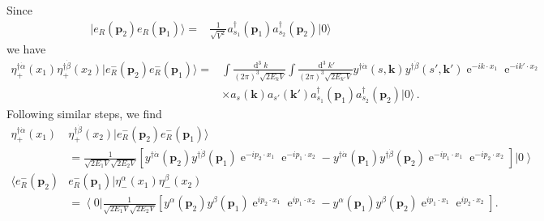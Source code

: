 Since
\begin{align}
  |e_R(\mathbf{p}_2)e_R(\mathbf{p}_1)\rangle=&\frac{1}{\sqrt{V^2}}a_{s_1}^\dagger(\mathbf{p}_1)a_{s_2}^\dagger(\mathbf{p}_2)|0\rangle
\end{align}
we have
\begin{align}
   \eta^{\dagger\dot{\alpha}}_+(x_1)\eta^{\dagger\dot{\beta}}_+(x_2)|e_R^-(\mathbf{p}_2)e_R^-(\mathbf{p}_1)\rangle=&
\int\frac{\operatorname{d}^3k}{(2\pi)^3\sqrt{2E_k V}}\int\frac{\operatorname{d}^3k'}{(2\pi)^3\sqrt{2E_{k'}V}}
y^{\dagger\dot{\alpha}}(s,\mathbf{k})y^{\dagger\dot{\beta}}(s',\mathbf{k}')\operatorname{e}^{-i k\cdot x_1}\operatorname{e}^{-i k'\cdot x_2}\nonumber\\
&\times a_s(\mathbf{k})a_{s'}(\mathbf{k}')a_{s_1}^\dagger(\mathbf{p}_1)a_{s_2}^\dagger(\mathbf{p}_2)|0\rangle \,.
\end{align}
Following similar steps, we find
\begin{align}
\eta^{\dagger\dot{\alpha}}_+(x_1)&\eta^{\dagger\dot{\beta}}_+(x_2)|e_R^-(\mathbf{p}_2)e_R^-(\mathbf{p}_1)\rangle
 \nonumber\\
\label{eq:berer}
&=\frac{1 }{\sqrt{2 E_1V}\sqrt{2 E_2V}} \left[ y^{\dagger\dot{\alpha}}(\mathbf{p}_2)y^{\dagger\dot{\beta}}(\mathbf{p}_1)
\operatorname{e}^{-i p_2\cdot x_1}\operatorname{e}^{-i p_1\cdot x_2}
-y^{\dagger\dot{\alpha}}(\mathbf{p}_1)y^{\dagger\dot{\beta}}(\mathbf{p}_2)
\operatorname{e}^{-i p_1\cdot x_1}\operatorname{e}^{-i p_2\cdot x_2}   \right] \left|0\right\rangle \\
\langle e_R^-(\mathbf{p}_2)&e_R^-(\mathbf{p}_1)| \eta^{\alpha}_-(x_1)\eta^{\beta}_-(x_2)
 \nonumber\\
\label{eq:berer}
&=\left\langle 0\right|\frac{1 }{\sqrt{2 E_1V}\sqrt{2 E_2V}} \left[ y^{\alpha}(\mathbf{p}_2)y^{\beta}(\mathbf{p}_1)
\operatorname{e}^{i p_2\cdot x_1}\operatorname{e}^{i p_1\cdot x_2}
- y^{\alpha}(\mathbf{p}_1)y^{\beta}(\mathbf{p}_2)
\operatorname{e}^{i p_1\cdot x_1}\operatorname{e}^{i p_2\cdot x_2}   \right].
\end{align}




